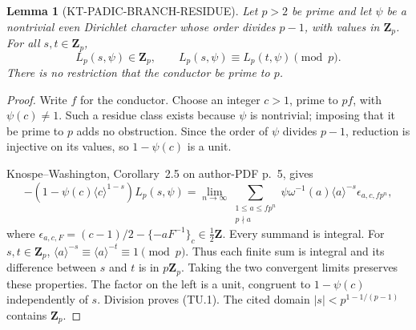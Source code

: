 \documentclass[11pt,a4paper]{article}
\newtheorem{lemma}[theorem]{Lemma}
\theoremstyle{definition}
\begin{document}
\begin{lemma}[KT-PADIC-BRANCH-RESIDUE]
Let $p>2$ be prime and let $\psi$ be a nontrivial even Dirichlet
character whose order divides $p-1$, with values in $\mathbf Z_p$.
For all $s,t\in\mathbf Z_p$,
\[
 L_p(s,\psi)\in\mathbf Z_p,\qquad
 L_p(s,\psi)\equiv L_p(t,\psi)\pmod p.                 \tag{TU.1}
\]
There is no restriction that the conductor be prime to $p$.
\end{lemma}
\begin{proof}
Write $f$ for the conductor.  Choose an integer $c>1$, prime to $pf$,
with $\psi(c)\ne1$.  Such a residue class exists because $\psi$ is
nontrivial; imposing that it be prime to $p$ adds no obstruction.
Since the order of $\psi$ divides $p-1$, reduction is injective on its
values, so $1-\psi(c)$ is a unit.

Knospe--Washington, Corollary~2.5 on author-PDF p.~5, gives
\[
 -(1-\psi(c)\langle c\rangle^{1-s})L_p(s,\psi)
 =\lim_{n\to\infty}\sum_{\substack{1\le a\le fp^n\\p\nmid a}}
     \psi\omega^{-1}(a)\langle a\rangle^{-s}
     \epsilon_{a,c,fp^n},                                  \tag{TU.2}
\]
where
$\epsilon_{a,c,F}=(c-1)/2-\{-aF^{-1}\}_c\in\tfrac12\mathbf Z$.
Every summand is integral.  For $s,t\in\mathbf Z_p$,
$\langle a\rangle^{-s}\equiv\langle a\rangle^{-t}\equiv1\pmod p$.
Thus each finite sum is integral and its difference between $s$ and
$t$ is in $p\mathbf Z_p$.  Taking the two convergent limits preserves
these properties.  The factor on the left is a unit, congruent to
$1-\psi(c)$ independently of $s$.  Division proves (TU.1).
The cited domain $|s|<p^{1-1/(p-1)}$ contains $\mathbf Z_p$.
\end{proof}
\end{document}
